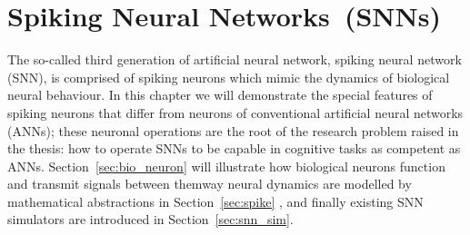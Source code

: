 \chapter{Spiking Neural Networks~(SNNs)}
\label{cha:bkg}
The so-called third generation of artificial neural network, \DIFaddbegin {}\DIFaddend spiking neural network (SNN), is comprised of spiking neurons which mimic the dynamics of biological neural behaviour.
In this chapter we will demonstrate the special features of spiking neurons that differ from neurons of conventional artificial neural networks (ANNs);
these \DIFdelbegin {}\DIFdelend \DIFaddbegin {}\DIFaddend neuronal operations are the root of the research problem raised in the thesis: how to operate SNNs to be capable in cognitive tasks \DIFaddbegin {}\DIFaddend as competent as ANNs.
Section~\ref{sec:bio_neuron} will illustrate how biological neurons function and transmit signals between them\DIFdelbegin {}\DIFdelend \DIFaddbegin {}\DIFaddend way neural dynamics are modelled by mathematical abstractions \DIFdelbegin {}\DIFdelend \DIFaddbegin {}\DIFaddend in Section~\ref{sec:spike} , and finally \DIFdelbegin {}\DIFdelend existing SNN simulators are introduced in Section~\ref{sec:snn_sim}.

